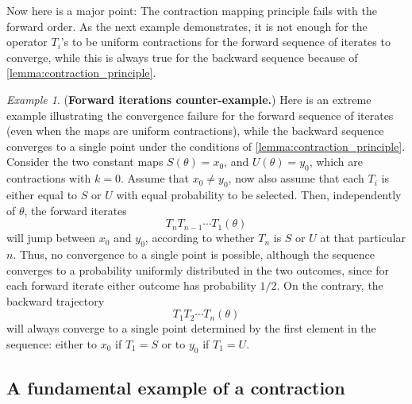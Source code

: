 \documentclass[10pt]{article} %
\theoremstyle{plain}
\theoremstyle{definition}
\theoremstyle{remark}
\newtheorem{example}[theorem]{Example}
\begin{document}
Now here is a major point: The contraction mapping principle fails with the forward order. As the next example demonstrates, it is not enough for the operator $T_i$'s to be uniform contractions for the forward sequence of iterates to converge, while this is always true for the backward sequence because of \cref{lemma:contraction_principle}.

\smallskip

\begin{example}\label{example:counter-example}
({\bf Forward iterations counter-example.})
Here is an extreme example illustrating the convergence failure for the forward sequence of iterates (even when the maps are uniform contractions), while the backward sequence converges to a single point under the conditions of \cref{lemma:contraction_principle}. Consider the two constant maps $S(\theta)=x_0$, and $U(\theta)=y_0$, which are contractions with $k=0$. Assume that $x_{0}\neq y_{0}$,
now also assume that each $T_{i}$ is either equal to $S$ or $U$ with equal probability to be selected. Then, independently of $\theta$, the forward iterates
\[
    T_{n}T_{n-1}\cdots T_{1}(\theta)
\]
will jump between $x_{0}$ and $y_{0}$, according to whether $T_{n}$
is $S$ or $U$ at that particular $n$. Thus, no convergence to a single point is possible, although the sequence converges to a probability  uniformly distributed in the two outcomes, since for each forward iterate either outcome has probability $1/2$. On the contrary, the backward trajectory
\[
    T_1 T_2\cdots T_n(\theta)
\]
will always converge to a single point determined by the first element in the sequence: either to $x_0$ if $T_1 = S$ or to $y_0$ if $T_1 = U$.
\end{example}


\subsection{A fundamental example of a contraction}
\end{document}
